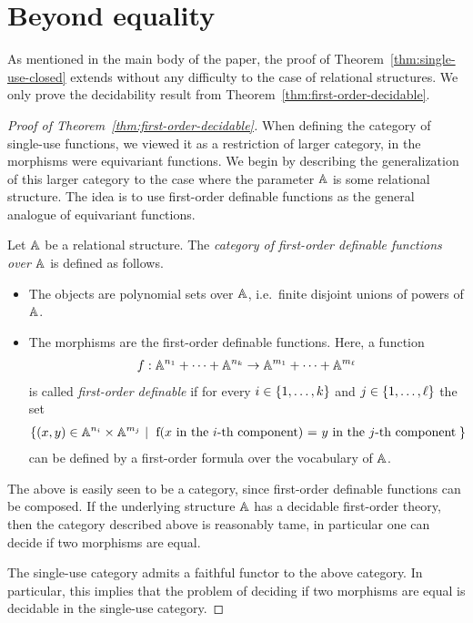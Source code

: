 \section{Beyond equality}
\label{sec:beyond-equality-appendix}

As mentioned in the main body of the paper, the proof of Theorem~\ref{thm:single-use-closed} extends without any difficulty to the case of relational structures. We only prove the decidability result from Theorem~\ref{thm:first-order-decidable}.


\begin{proof}[Proof of Theorem~\ref{thm:first-order-decidable}]
    When defining the category of single-use functions, we viewed it as a restriction of larger category, in the morphisms were equivariant functions.  We begin by describing the generalization of this larger category to the case where the parameter $\mathbb A$ is some relational structure. The idea is to use first-order definable functions as the general analogue of equivariant functions. 

\begin{definition}
    Let $\mathbb A$ be a relational structure. The \emph{category of first-order definable functions over $\mathbb A$} is defined as follows.
    \begin{itemize}
        \item The objects are polynomial sets over $\mathbb A$, i.e.~finite disjoint unions of powers of $\mathbb A$.
        \item The morphisms are the  first-order definable functions. Here, a function 
        \begin{align*}
            f : \mathbb A^{n_1} + \cdots + \mathbb A^{n_k} \to \mathbb A^{m_1} + \cdots + \mathbb A^{m_\ell}
            \end{align*}
            is called  \emph{first-order definable} if for every $i \in \{1,\ldots,k\}$ and  $j \in \{1,\ldots,\ell\}$ the set 
            \begin{align*}
            \setbuild{ (x,y) \in \atoms^{n_i} \times \atoms^{m_j}}{f(\text{$x$ in the $i$-th component}) = \text{$y$ in the $j$-th component}}
            \end{align*}
            can be defined by a first-order formula over the vocabulary of $\mathbb A$.
    \end{itemize}
\end{definition}
The above is easily seen to be a category, since first-order definable functions  can be composed. 
If the underlying structure $\mathbb A$ has a decidable first-order theory, then the category described above is reasonably tame, in particular one can decide if two morphisms are equal.

The single-use category admits a faithful functor to the above category. In particular, this implies that the problem of deciding if two morphisms are equal is decidable in the single-use category. 
\end{proof}
